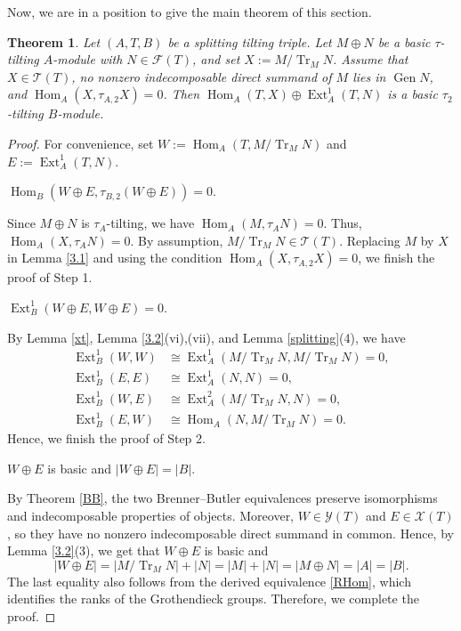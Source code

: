 \documentclass[reqno,12pt]{amsart}
\numberwithin{equation}{section}
\theoremstyle{plain}
\newtheorem{theorem}{\bf Theorem}[section]
\theoremstyle{definition}
\begin{document}
Now, we are in a position to give the main theorem of this section.
\begin{theorem} \label{3.3}
Let \( (A, T, B) \) be a splitting tilting triple.
Let \(M\oplus N\) be a basic \(\tau\)-tilting $A$-module with
\(N\in\mathcal{F}(T)\), and set $X:=M/\operatorname{Tr}_MN$. Assume that $X\in\mathcal{T}(T)$, no nonzero indecomposable direct summand of $M$ lies in $\operatorname{Gen}N$, and
$\operatorname{Hom}_A(X,\tau_{A,2}X)=0$. Then
\(
\operatorname{Hom}_A(T,X)\oplus\operatorname{Ext}_A^1(T,N)
\)
is a basic \( \tau_{2} \)-tilting $B$-module.
\end{theorem}
\begin{proof}
For convenience, set $W:=\operatorname{Hom}_A(T, M / \operatorname{Tr}_M N)$ and $E:=\operatorname{Ext}_A^1(T, N)$.

 \(\operatorname{Hom}_B(W \oplus E, \tau_{B,2}(W \oplus E)) = 0.\)

Since \( M \oplus N \) is \( \tau_A \)-tilting, we have
\(\operatorname{Hom}_A(M, \tau_A N) = 0.\)
Thus, \(\operatorname{Hom}_A(X,\tau_A N)=0\).
By assumption, $M/\operatorname{Tr}_MN\in\mathcal{T}(T)$.
Replacing \(M\) by \(X\) in Lemma \ref{3.1} and using the condition
$\operatorname{Hom}_A(X,\tau_{A,2}X)=0$, we finish the proof of Step 1.

\(\operatorname{Ext}_B^1(W \oplus E, W \oplus E) = 0.\)

By Lemma \ref{xt}, Lemma \ref{3.2}(vi),(vii), and
Lemma \ref{splitting}(4), we have
\begin{align*}
\operatorname{Ext}_B^1(W,W)
&\cong \operatorname{Ext}_A^1(M / \operatorname{Tr}_M N,
 M / \operatorname{Tr}_M N)=0,\\
\operatorname{Ext}_B^1(E,E)
&\cong \operatorname{Ext}_A^1(N,N)=0,\\
\operatorname{Ext}_B^1(W,E)
&\cong \operatorname{Ext}_A^2(M / \operatorname{Tr}_M N,N)=0,\\
\operatorname{Ext}_B^1(E,W)
&\cong \operatorname{Hom}_A(N,M / \operatorname{Tr}_M N)=0.
\end{align*}
Hence, we finish the proof of Step 2.

\( W \oplus E \) is basic and \(|W \oplus E| = |B|.\)


By Theorem \ref{BB}, the two Brenner--Butler equivalences preserve isomorphisms and indecomposable properties of objects. Moreover, $W\in\mathcal{Y}(T)$ and $E\in\mathcal{X}(T)$, so they have no nonzero indecomposable direct summand in common. Hence, by Lemma \ref{3.2}(3), we get that $W\oplus E$ is basic and
\[
|W\oplus E|
=|M/\operatorname{Tr}_MN|+|N|
=|M|+|N|
=|M\oplus N|
=|A|
=|B|.
\]
The last equality also follows from the derived equivalence \eqref{RHom}, which identifies the ranks of the Grothendieck groups.
Therefore, we complete the proof.
\end{proof}
\end{document}
